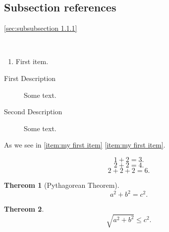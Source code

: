 \documentclass{article}
\newtheorem{theorem}{Thereom}
\begin{document}
  
  \subsection{Subsection references}
  \cref{sec:subsubsection 1.1.1}\\


   \\

  \begin{enumerate}
    \item \label{item:my first item} First item.
  \end{enumerate}
  \begin{description}
    \item[First Description\label{item:my 1st description item}] Some text.
    \item[Second Description\label{item:my 2nd description item}] Some text.
  \end{description}
  
  As we see in \ref{item:my first item} \cref{item:my first item}.

  \begin{equation}
    \label{eq:my 1st math}
    1 + 2 = 3.
  \end{equation}
  \begin{equation}
    \label{eq:my 2nd math}
    2 + 2 = 4.
  \end{equation}
  \begin{equation}
    \label{eq:my 3rd math}
    2 + 2 + 2 = 6.
  \end{equation}
  \begin{theorem}[Pythagorean Theorem]
    \label{result:my 1st theorem}
    \[ a^2 + b^2 = c^2. \]
  \end{theorem}
  \begin{theorem}
    \label{result:my 2nd theorem}
    \[ \sqrt{a^2 + b^2} \leq c^2. \]
  \end{theorem}



   \\
   \\
   \\
   \\
   \\ 
   \\ 
\end{document}
